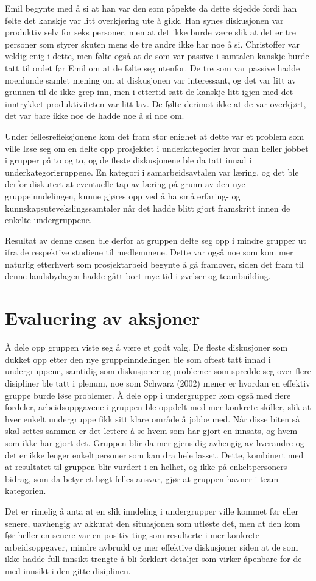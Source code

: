 Emil begynte med å si at han var den som påpekte da dette skjedde fordi han følte det kanskje var litt overkjøring ute å gikk. Han synes diskusjonen var produktiv selv for seks personer, men at det ikke burde være slik at det er tre personer som styrer skuten mens de tre andre ikke har noe å si. Christoffer var veldig enig i dette, men følte også at de som var passive i samtalen kanskje burde tatt til ordet før Emil om at de følte seg utenfor. De tre som var passive hadde noenlunde samlet mening om at diskusjonen var interessant, og det var litt av grunnen til de ikke grep inn, men i ettertid satt de kanskje litt igjen med det inntrykket produktiviteten var litt lav. De følte derimot ikke at de var overkjørt, det var bare ikke noe de hadde noe å si noe om.

Under fellesrefleksjonene kom det fram stor enighet at dette var et problem som ville løse seg om en delte opp prosjektet i underkategorier hvor man heller jobbet i grupper på to og to, og de fleste diskusjonene ble da tatt innad i underkategorigruppene. En kategori i samarbeidsavtalen var læring, og det ble derfor diskutert at eventuelle tap av læring på grunn av den nye gruppeinndelingen, kunne gjøres opp ved å ha små erfaring- og kunnskapsutevekslingssamtaler når det hadde blitt gjort framskritt innen de enkelte undergruppene.

Resultat av denne casen ble derfor at gruppen delte seg opp i mindre grupper ut ifra de respektive studiene til medlemmene. Dette var også noe som kom mer naturlig etterhvert som prosjektarbeid begynte å gå framover, siden det fram til denne landsbydagen hadde gått bort mye tid i øvelser og teambuilding.

\section{Evaluering av aksjoner}
Å dele opp gruppen viste seg å være et godt valg. De fleste diskusjoner som dukket opp etter den nye gruppeinndelingen ble som oftest tatt innad i undergruppene, samtidig som diskusjoner og problemer som spredde seg over flere disipliner ble tatt i plenum, noe som Schwarz (2002) mener er hvordan en effektiv gruppe burde løse problemer. \cite{Artikkel3} Å dele opp i undergrupper kom også med flere fordeler, arbeidsoppgavene i gruppen ble oppdelt med mer konkrete skiller, slik at hver enkelt undergruppe fikk sitt klare område å jobbe med. Når disse biten så skal settes sammen er det lettere å se hvem som har gjort en innsats, og hvem som ikke har gjort det. Gruppen blir da mer gjensidig avhengig av hverandre og det er ikke lenger enkeltpersoner som kan dra hele lasset. Dette, kombinert med at resultatet til gruppen blir vurdert i en helhet, og ikke på enkeltpersoners bidrag, som da betyr et høgt felles ansvar, gjør at gruppen havner i team kategorien. \cite{Artikkel4}


Det er rimelig å anta at en slik inndeling i undergrupper ville kommet før eller senere, uavhengig av akkurat den situasjonen som utløste det, men at den kom før heller en senere var en positiv ting som resulterte i mer konkrete arbeidsoppgaver, mindre avbrudd og mer effektive diskusjoner siden at de som ikke hadde full innsikt trengte å bli forklart detaljer som virker åpenbare for de med innsikt i den gitte disiplinen.